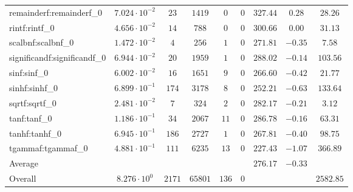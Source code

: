 \begin{tabular}{|l|c|c|c|c|c|c|c|c|}
remainderf:remainderf\_0     & $ 7.024 \cdot 10^{-2} $ & $ 23     $ & $ 1419  $ & $ 0   $ & $ 0   $ & $ 327.44      $ & $ 0.28    $ & $ 28.26   $ \\
rintf:rintf\_0               & $ 4.656 \cdot 10^{-2} $ & $ 14     $ & $ 788   $ & $ 0   $ & $ 0   $ & $ 300.66      $ & $ 0.00    $ & $ 31.13   $ \\
scalbnf:scalbnf\_0           & $ 1.472 \cdot 10^{-2} $ & $ 4      $ & $ 256   $ & $ 1   $ & $ 0   $ & $ 271.81      $ & $ -0.35   $ & $ 7.58    $ \\
significandf:significandf\_0 & $ 6.944 \cdot 10^{-2} $ & $ 20     $ & $ 1959  $ & $ 1   $ & $ 0   $ & $ 288.02      $ & $ -0.14   $ & $ 103.56  $ \\
sinf:sinf\_0                 & $ 6.002 \cdot 10^{-2} $ & $ 16     $ & $ 1651  $ & $ 9   $ & $ 0   $ & $ 266.60      $ & $ -0.42   $ & $ 21.77   $ \\
sinhf:sinhf\_0               & $ 6.899 \cdot 10^{-1} $ & $ 174    $ & $ 3178  $ & $ 8   $ & $ 0   $ & $ 252.21      $ & $ -0.63   $ & $ 133.64  $ \\
sqrtf:sqrtf\_0               & $ 2.481 \cdot 10^{-2} $ & $ 7      $ & $ 324   $ & $ 2   $ & $ 0   $ & $ 282.17      $ & $ -0.21   $ & $ 3.12    $ \\
tanf:tanf\_0                 & $ 1.186 \cdot 10^{-1} $ & $ 34     $ & $ 2067  $ & $ 11  $ & $ 0   $ & $ 286.78      $ & $ -0.16   $ & $ 63.31   $ \\
tanhf:tanhf\_0               & $ 6.945 \cdot 10^{-1} $ & $ 186    $ & $ 2727  $ & $ 1   $ & $ 0   $ & $ 267.81      $ & $ -0.40   $ & $ 98.75   $ \\
tgammaf:tgammaf\_0           & $ 4.881 \cdot 10^{-1} $ & $ 111    $ & $ 6235  $ & $ 13  $ & $ 0   $ & $ 227.43      $ & $ -1.07   $ & $ 366.89  $ \\
\hline
Average                      & $                     $ & $        $ & $       $ & $     $ & $     $ & $ 276.17      $ & $ -0.33   $ & $         $ \\
\hline
Overall                      & $ 8.276 \cdot 10^{0}  $ & $ 2171   $ & $ 65801 $ & $ 136 $ & $ 0   $ & $             $ & $         $ & $ 2582.85 $ \\
\hline
\end{tabular}
